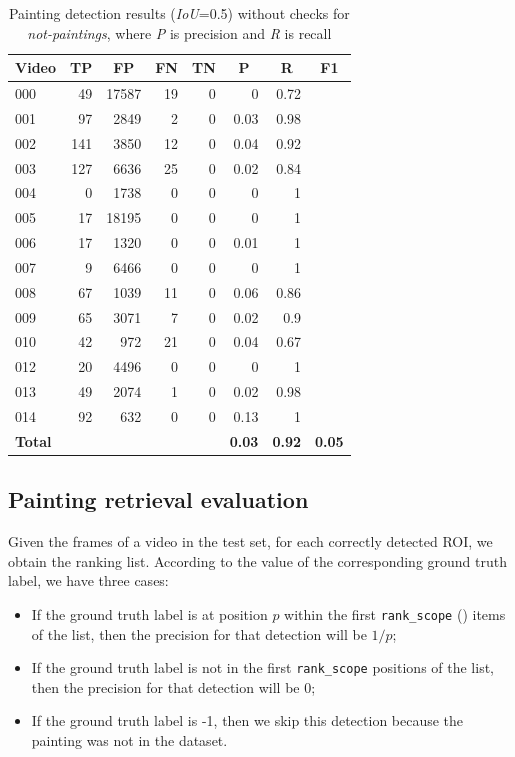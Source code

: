 \documentclass[10pt,twocolumn,letterpaper]{article}
\begin{document}
\begin{table}[]
\begin{center}
\begin{tabular}{lrrrrrrr}
\multicolumn{1}{c}{\textbf{Video}} & \multicolumn{1}{c}{\textbf{TP}} & \multicolumn{1}{c}{\textbf{FP}} & \multicolumn{1}{c}{\textbf{FN}} & \multicolumn{1}{c}{\textbf{TN}} & \multicolumn{1}{c}{\textbf{P}} & \multicolumn{1}{c}{\textbf{R}} & \multicolumn{1}{c}{\textbf{F1}} \\ \hline \hline
000 & 49 & 17587 & 19 & 0 & 0 & 0.72 &  \\
001 & 97 & 2849 & 2 & 0 & 0.03 & 0.98 &  \\
002 & 141 & 3850 & 12 & 0 & 0.04 & 0.92 &  \\
003 & 127 & 6636 & 25 & 0 & 0.02 & 0.84 &  \\
004 & 0 & 1738 & 0 & 0 & 0 & 1 &  \\
005 & 17 & 18195 & 0 & 0 & 0 & 1 &  \\
006 & 17 & 1320 & 0 & 0 & 0.01 & 1 &  \\
007 & 9 & 6466 & 0 & 0 & 0 & 1 &  \\
008 & 67 & 1039 & 11 & 0 & 0.06 & 0.86 &  \\
009 & 65 & 3071 & 7 & 0 & 0.02 & 0.9 &  \\
010 & 42 & 972 & 21 & 0 & 0.04 & 0.67 &  \\
012 & 20 & 4496 & 0 & 0 & 0 & 1 &  \\
013 & 49 & 2074 & 1 & 0 & 0.02 & 0.98 &  \\
014 & 92 & 632 & 0 & 0 & 0.13 & 1 &  \\ \hline \hline
\textbf{Total} &  &  &  &  & \textbf{0.03} & \textbf{0.92} & \textbf{0.05} \\
\end{tabular}
\end{center}
\caption{Painting detection results (\textit{IoU}=0.5) without checks for \textit{not-paintings}, where \textit{P} is precision and \textit{R} is recall}
\label{tab:PaintingDetectionResults2}
\end{table}

\subsection{Painting retrieval evaluation}
\label{subsec:PaintingRetrievalEvaluation}
Given the frames of a video in the test set, for each correctly detected ROI, we obtain the ranking list. According to the value of the corresponding ground truth label, we have three cases:
\begin{itemize}
    \item If the ground truth label is at position $p$ within the first \texttt{rank\_scope} () items of the list, then the precision for that detection will be $1/p$;
    \item If the ground truth label is not in the first \texttt{rank\_scope} positions of the list, then the precision for that detection will be 0;
    \item If the ground truth label is -1, then we skip this detection because the painting was not in the dataset.
\end{itemize}
\end{document}
